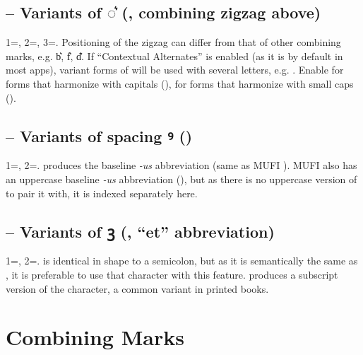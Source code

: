\subsection{ -- Variants of ◌͛ (, combining
zigzag above)}
1=, 2=, 3=. Positioning of the zigzag can differ from that of other combining
marks, e.g. b͛, f͛, d͛. If  ``Contextual Alternates'' is enabled (as it is by
default in most apps), variant forms of  will be used with several letters, e.g. . Enable  for forms that harmonize with capitals
({}),  for forms that harmonize with small caps
  (\textsc{}).

\subsection{ -- Variants of spacing ꝰ ()}
1=, 2=.  produces the baseline \textit{{}-us} abbreviation (same as MUFI
). MUFI also has an uppercase baseline \textit{{}-us} abbreviation (), but as there is no uppercase version
of  to pair it with, it is indexed separately here.

\subsection{ -- Variants of ꝫ (, ``et'' abbreviation)}
1=, 2=. \textSourceText{[1]} is identical in shape to a
semicolon, but as it is semantically the same as , it is preferable to use that
character with this feature. \textSourceText{[2]} produces a subscript version of
the character, a common variant in printed books.

\section{Combining Marks}

